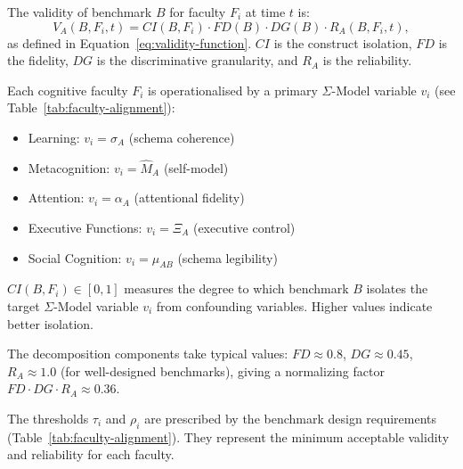
\begin{definition}
The validity of benchmark $B$ for faculty $F_i$ at time $t$ is:
\[
V_A(B, F_i, t) = CI(B, F_i) \cdot FD(B) \cdot DG(B) \cdot R_A(B, F_i, t),
\]
as defined in Equation~\eqref{eq:validity-function}. $CI$ is the
construct isolation, $FD$ is the fidelity, $DG$ is the discriminative
granularity, and $R_A$ is the reliability.
\end{definition}

\begin{definition}
Each cognitive faculty $F_i$ is operationalised by a primary
$\Sigma$-Model variable $v_i$ (see Table~\ref{tab:faculty-alignment}):
\begin{itemize}[nosep]
\item Learning: $v_i = \sigma_A$ (schema coherence)
\item Metacognition: $v_i = \hat{M}_A$ (self-model)
\item Attention: $v_i = \alpha_A$ (attentional fidelity)
\item Executive Functions: $v_i = \Xi_A$ (executive control)
\item Social Cognition: $v_i = \mu_{AB}$ (schema legibility)
\end{itemize}
\end{definition}

\begin{definition}
$CI(B, F_i) \in [0, 1]$ measures the degree to which benchmark $B$
isolates the target $\Sigma$-Model variable $v_i$ from confounding
variables. Higher values indicate better isolation.
\end{definition}

\begin{assumption}
The decomposition components take typical values:
$FD \approx 0.8$, $DG \approx 0.45$, $R_A \approx 1.0$ (for well-designed
benchmarks), giving a normalizing factor $FD \cdot DG \cdot R_A \approx 0.36$.
\end{assumption}

\begin{assumption}
The thresholds $\tau_i$ and $\rho_i$ are prescribed by the benchmark
design requirements (Table~\ref{tab:faculty-alignment}). They represent
the minimum acceptable validity and reliability for each faculty.
\end{assumption}

